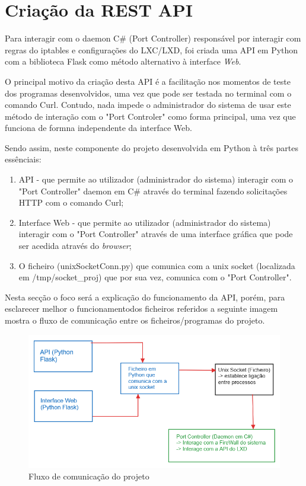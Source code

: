 \section{Criação da REST API}

Para interagir com o daemon C\# (Port Controller) responsável por interagir com regras do iptables
e configurações do LXC/LXD, foi criada uma API em Python com a biblioteca Flask como
método alternativo à interface \textit{Web}.

O principal motivo da criação desta API é a facilitação nos momentos de teste dos programas
desenvolvidos, uma vez que pode ser testada no terminal com o comando Curl. Contudo, nada 
impede o administrador do sistema de usar este método de interação com o "Port Controler"
como forma principal, uma vez que funciona de formna independente da interface Web.

Sendo assim, neste componente do projeto desenvolvida em Python à três partes essênciais:

\begin{enumerate}
    \item API - que permite ao utilizador (administrador do sistema) interagir com o "Port Controller" daemon em C\#
    através do terminal fazendo solicitações HTTP com o comando Curl;
    \item Interface Web - que permite ao utilizador (administrador do sistema) interagir com o "Port Controller"
    através de uma interface gráfica que pode ser acedida através do \textit{browser};
    \item O ficheiro (unixSocketConn.py) que comunica com a unix socket (localizada em /tmp/socket\_proj) que por sua vez, comunica com o "Port Controller". 
\end{enumerate}

Nesta secção o foco será a explicação do funcionamento da API, porém, para esclarecer
melhor o funcionamentodos ficheiros referidos a seguinte imagem
mostra o fluxo de comunicação entre os ficheiros/programas do projeto.

\begin{figure}[H]
\begin{center}
\includegraphics[width=14cm]{figs/fluxo de comunicação.png}
\caption{Fluxo de comunicação do projeto}
\label{fig:bookstack}
\end{center}
\end{figure}



